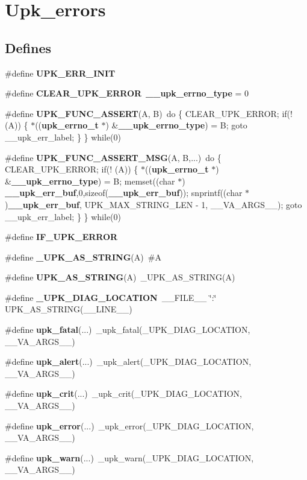 \section{Upk\_\-errors}
\label{group__upk__errors}
\subsection*{Defines}
\begin{DoxyCompactItemize}
\item 
\#define {\bf UPK\_\-ERR\_\-INIT}
\item 
\#define {\bf CLEAR\_\-UPK\_\-ERROR}~{\bf \_\-\_\-upk\_\-errno\_\-type} = 0
\item 
\#define {\bf UPK\_\-FUNC\_\-ASSERT}(A, B)~do \{ CLEAR\_\-UPK\_\-ERROR; if(! (A)) \{ $\ast$(({\bf upk\_\-errno\_\-t} $\ast$) \&{\bf \_\-\_\-upk\_\-errno\_\-type}) = B; goto \_\-\_\-upk\_\-err\_\-label; \} \} while(0)
\item 
\#define {\bf UPK\_\-FUNC\_\-ASSERT\_\-MSG}(A, B,...)~do \{ CLEAR\_\-UPK\_\-ERROR; if(! (A)) \{ $\ast$(({\bf upk\_\-errno\_\-t} $\ast$) \&{\bf \_\-\_\-upk\_\-errno\_\-type}) = B; memset((char $\ast$) {\bf \_\-\_\-upk\_\-err\_\-buf},0,sizeof({\bf \_\-\_\-upk\_\-err\_\-buf})); snprintf((char $\ast$){\bf \_\-\_\-upk\_\-err\_\-buf}, UPK\_\-MAX\_\-STRING\_\-LEN -\/ 1, \_\-\_\-VA\_\-ARGS\_\-\_\-); goto \_\-\_\-upk\_\-err\_\-label; \} \} while(0)
\item 
\#define {\bf IF\_\-UPK\_\-ERROR}
\item 
\#define {\bf \_\-UPK\_\-AS\_\-STRING}(A)~\#A
\item 
\#define {\bf UPK\_\-AS\_\-STRING}(A)~\_\-UPK\_\-AS\_\-STRING(A)
\item 
\#define {\bf \_\-UPK\_\-DIAG\_\-LOCATION}~\_\-\_\-FILE\_\-\_\- \char`\"{}:\char`\"{} UPK\_\-AS\_\-STRING(\_\-\_\-LINE\_\-\_\-)
\item 
\#define {\bf upk\_\-fatal}(...)~\_\-upk\_\-fatal(\_\-UPK\_\-DIAG\_\-LOCATION, \_\-\_\-VA\_\-ARGS\_\-\_\-)
\item 
\#define {\bf upk\_\-alert}(...)~\_\-upk\_\-alert(\_\-UPK\_\-DIAG\_\-LOCATION, \_\-\_\-VA\_\-ARGS\_\-\_\-)
\item 
\#define {\bf upk\_\-crit}(...)~\_\-upk\_\-crit(\_\-UPK\_\-DIAG\_\-LOCATION, \_\-\_\-VA\_\-ARGS\_\-\_\-)
\item 
\#define {\bf upk\_\-error}(...)~\_\-upk\_\-error(\_\-UPK\_\-DIAG\_\-LOCATION, \_\-\_\-VA\_\-ARGS\_\-\_\-)
\item 
\#define {\bf upk\_\-warn}(...)~\_\-upk\_\-warn(\_\-UPK\_\-DIAG\_\-LOCATION, \_\-\_\-VA\_\-ARGS\_\-\_\-)

\end{DoxyCompactItemize}
